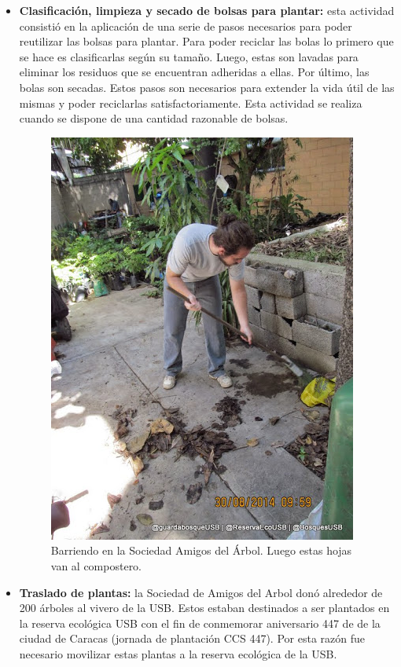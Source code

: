 \begin{itemize}
\item \textbf{Clasificación, limpieza y secado de bolsas para plantar:} esta actividad consistió en la aplicación de una serie de pasos necesarios para poder reutilizar las bolsas para plantar. Para poder reciclar las bolas lo primero que se hace es clasificarlas según su tamaño. Luego, estas son lavadas para eliminar los residuos que se encuentran adheridas a ellas. Por último, las bolas son secadas. Estos pasos son necesarios para extender la vida útil de las mismas y poder reciclarlas satisfactoriamente. Esta actividad se realiza cuando se dispone de una cantidad razonable de bolsas.

\begin{figure}[h]
    \centering
    \includegraphics[scale=0.5]{imagenes/foto1}
    \caption{Barriendo en la Sociedad Amigos del Árbol. Luego estas hojas van al compostero.}
    \label{foto1}
\end{figure}

\item \textbf{Traslado de plantas:} la Sociedad de Amigos del Arbol donó alrededor de 200 árboles al vivero de la USB. Estos estaban destinados a ser plantados en la reserva ecológica USB con el fin de conmemorar aniversario 447 de de la ciudad de Caracas (jornada de plantación CCS 447). Por esta razón fue necesario movilizar estas plantas a la reserva ecológica de la USB.


\end{itemize}
